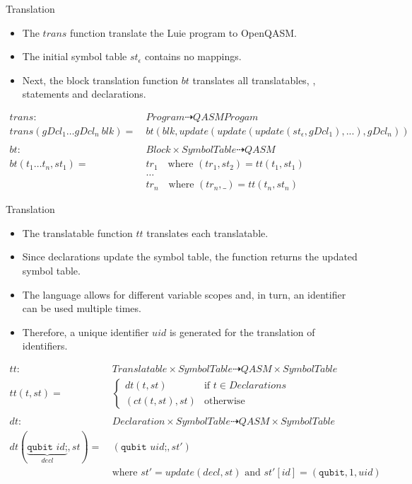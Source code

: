 \begin{frame}{Translation}
    \begin{itemize}
        \item The $trans$ function translate the Luie program to OpenQASM.
        \item The initial symbol table $st_\epsilon$ contains no mappings.
        \item Next, the block translation function $bt$ translates all translatables, \ie, statements and declarations.
    \end{itemize}
    \begin{align*}
        trans : \ & Program \dashrightarrow QASMProgam\\
        trans(gDcl_1 \dots gDcl_n \ blk) = \ & bt(blk, update(update(update(st_\epsilon, gDcl_1), ...), gDcl_n))\\
        &\\
        bt : \ & Block \times SymbolTable \dashrightarrow QASM\\
        bt(t_1 \dots t_n, st_1) = \ &  tr_1 \quad \text{where } (tr_1, st_2) = tt(t_1, st_1)\\
        & \dots\\
        & tr_n \quad \text{where } (tr_n, \_) = tt(t_n, st_n)
    \end{align*}
\end{frame}
\begin{frame}{Translation}
    \begin{itemize}
        \item The translatable function $tt$ translates each translatable.
        \item Since declarations update the symbol table, the function returns the updated symbol table.
        \item The language allows for different variable scopes and, in turn, an identifier can be used multiple times.
        \item Therefore, a unique identifier $uid$ is generated for the translation of identifiers. 
    \end{itemize}
    \begin{align*}
        tt : \ & Translatable \times SymbolTable \dashrightarrow QASM \times SymbolTable\\
        tt(t, st) = \ & \begin{cases}
            dt(t, st)  \quad &\text{if } t \in Declarations\\
            (ct(t, st), st) &\text{otherwise }
        \end{cases}\\
        &\\
        dt : \ & Declaration \times SymbolTable \dashrightarrow QASM \times SymbolTable\\
        dt(\underbrace{\texttt{qubit } id \text{;}}_{decl}, st) = \ & (\texttt{qubit } uid\texttt{;}, st')\\
                                                                    & \text{where } st' = update(decl, st) \text{ and } st'[id] = (\texttt{qubit}, 1, uid)\\
    \end{align*}
\end{frame}

